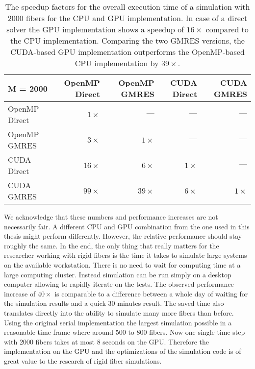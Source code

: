 \begin{table}[!htbp]
  \begin{center}
    \begin{tabulary}{\textwidth}{lRRRR}
      \toprule
      M = 2000 & OpenMP Direct & OpenMP GMRES & CUDA Direct & CUDA GMRES \\
      \midrule
      OpenMP Direct & $1×$  & $—$   & $—$ & $—$ \\
      OpenMP GMRES  & $3×$  & $1×$  & $—$ & $—$ \\
      CUDA Direct   & $16×$ & $6×$  & $1×$ & $—$ \\
      CUDA GMRES    & $99×$ & $39×$ & $6×$ & $1×$ \\
      \bottomrule
    \end{tabulary}
  \end{center}
  \caption[Speedup factors for overall execution time.]{The speedup factors for the overall execution time of a simulation with $2000$ fibers for the CPU and GPU implementation. In case of a direct solver the GPU implementation shows a speedup of $16×$ compared to the CPU implementation. Comparing the two GMRES versions, the CUDA-based GPU implementation outperforms the OpenMP-based CPU implementation by $39×$.}
  \label{tab:overall_speedup}
\end{table}

We acknowledge that these numbers and performance increases are not necessarily fair. A different CPU and GPU combination from the one used in this thesis might perform differently. However, the relative performance should stay roughly the same. In the end, the only thing that really matters for the researcher working with rigid fibers is the time it takes to simulate large systems on the available workstation. There is no need to wait for computing time at a large computing cluster. Instead simulation can be run simply on a desktop computer allowing to rapidly iterate on the tests. The observed performance increase of $40×$ is comparable to a difference between a whole day of waiting for the simulation results and a quick $30$ minutes result. The saved time also translates directly into the ability to simulate many more fibers than before. Using the original serial implementation the largest simulation possible in a reasonable time frame where around $500$ to $800$ fibers. Now one single time step with $2000$ fibers takes at most $8$ seconds on the GPU. Therefore the implementation on the GPU and the optimizations of the simulation code is of great value to the research of rigid fiber simulations.
